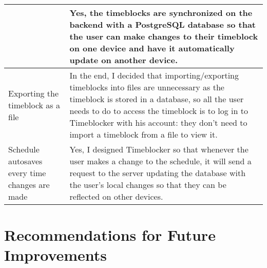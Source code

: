 \documentclass[12pt]{report}
\begin{document}
\begin{xltabular}{\textwidth}{|X|X|}
	&
	Yes, the timeblocks are synchronized on the backend with a PostgreSQL database so that the user can make changes to their timeblock on one device and have it automatically update on another device.
	\\\hline
	Exporting the timeblock as a file
	&
	In the end, I decided that importing/exporting timeblocks into files are unnecessary as the timeblock is stored in a database, so all the user needs to do to access the timeblock is to log in to Timeblocker with his account: they don't need to import a timeblock from a file to view it.
	\\\hline
	Schedule autosaves every time changes are made
	&
	Yes, I designed Timeblocker so that whenever the user makes a change to the schedule, it will send a request to the server updating the database with the user's local changes so that they can be reflected on other devices.
	\\\hline
\end{xltabular}

\section*{Recommendations for Future Improvements}
\end{document}

